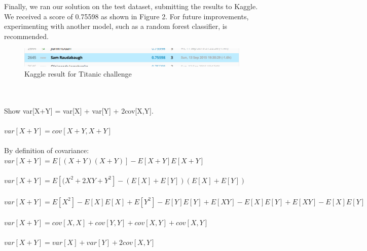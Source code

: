 \documentclass[12pt]{report}
\begin{document}
Finally, we ran our solution on the test dataset, submitting the results to Kaggle. We received a score of 0.75598 as shown in Figure 2. For future improvements, experimenting with another model,
such as a random forest classifier, is recommended.
\begin{figure}
\centering
  \includegraphics[width=150mm]{figures/kaggle-titanic.png}
\caption{Kaggle result for Titanic challenge}
\end{figure}
\newpage
{}
\\\\
Show var[X+Y] = var[X] + var[Y] + 2cov[X,Y].
\\\\
$var[X+Y] = cov[X+Y, X+Y]$
\\\\
By definition of covariance:
\\
$var[X+Y] = E[(X+Y)(X+Y)] - E[X+Y]E[X+Y]$
\\\\
$var[X+Y] = E[(X^2+2XY+Y^2]-(E[X]+E[Y])(E[X]+E[Y])$
\\\\
$var[X+Y] = E[X^2]-E[X]E[X] + E[Y^2]-E[Y]E[Y] + E[XY]-E[X]E[Y] + E[XY]-E[X]E[Y]$
\\\\
$var[X+Y] = cov[X,X] + cov[Y,Y] + cov[X,Y] + cov[X,Y]$
\\\\
$var[X+Y] = var[X] + var[Y] + 2cov[X,Y]$
\end{document}
